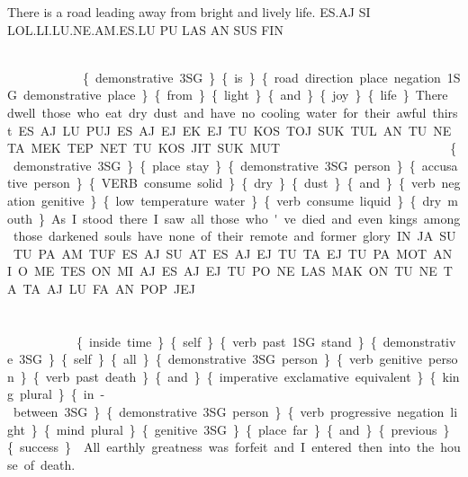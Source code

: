 {\drie 
 

There is a road leading away from bright and lively life.  
 ES.AJ SI LOL.LI.LU.NE.AM.ES.LU PU LAS AN SUS FIN 

\es\aj ~ \si ~ \lol\li\lu\Atlanne\am\es\lu ~ \pu ~ \las ~ \an ~ \sus ~ \fin

\{demonstrative 3SG\} \{is\} \{road direction place negation 1SG demonstrative place\} \{from\} \{light\} \{and\} \{joy\} \{life\} 

 
 

There dwell those who eat dry dust and have no cooling water for their awful thirst.  
 ES.AJ LU.PUJ ES.AJ.EJ EK.EJ TU.KOS.TOJ SUK TUL AN TU.NE.TA MEK.TEP.NET TU.KOS.JIT SUK.MUT 

\es\aj ~ \lu\puj ~ \es\aj\ej ~ \ek\ek ~ \tu\kos\toj ~ \suk ~ \tul ~ \an ~ \tu\Atlanne\ta ~ \mek\tep\net ~ \tu\kos\jit ~ \suk\mut

\{demonstrative 3SG\} \{place stay\} \{demonstrative 3SG person\} \{accusative person\} \{VERB consume solid\} \{dry\} \{dust\} \{and\} \{verb negation genitive\} \{low temperature water\} \{verb consume liquid\} \{dry mouth\} 

 
 

 
 
As I stood there I saw all those who've died and even kings among those darkened souls have none of their remote and former glory. 

IN.JA SU TU.PA.AM.TUF ES.AJ SU AT ES.AJ.EJ TU.TA.EJ TU.PA.MOT AN I.O.ME TES.ON MI.AJ ES.AJ.EJ TU.PO.NE.LAS MAK.ON TU.NE.TA TA.AJ LU.FA AN POP JEJ 

\Atlanin\ja ~ \su ~ \tu\pa\am\tuf ~ \es\aj ~ \su ~ \at ~ \es\aj\ej ~ \\\tu\ta\ej ~ \tu\pa\mot ~ \an ~ \Atlani\Atlano\me ~ \\ ~ \tes\on ~ \mi\aj ~ \es\aj\ej ~ \tu\po\Atlanne\las ~ \mak\on ~ \\ ~ \tu\Atlanne\ta ~ \ta\taj ~ \lu\fa ~ \an ~ \pop ~ \jej


\{inside time\} \{self\} \{verb past 1SG stand\} \{demonstrative 3SG\} \{self\} \{all\} \{demonstrative 3SG person\} \{verb genitive person\} \{verb past death\} \{and\} \{imperative exclamative equivalent\} \{king plural\} \{in-between 3SG\} \{demonstrative 3SG person\} \{verb progressive negation light\} \{mind plural\} \{genitive 3SG\} \{place far\} \{and\} \{previous\} \{success\} 

 
\drie 

All earthly greatness was forfeit and I entered then into the house of death.  

}

